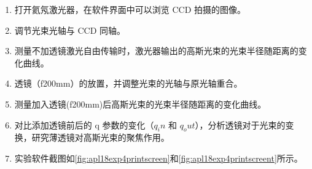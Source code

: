\begin{enumerate}
\begin{enumerate}
		\item 打开氦氖激光器，在软件界面中可以浏览 CCD 拍摄的图像。
		
		\item 调节光束光轴与 CCD 同轴。
		
		\item 测量不加透镜激光自由传输时，激光器输出的高斯光束的光束半径随距离的变化曲线。
		
		\item 透镜（f200mm）的放置，并调整光束的光轴与原光轴重合。
		
		\item 测量加入透镜(f200mm)后高斯光束的光束半径随距离的变化曲线。
		
		\item 对比添加透镜前后的 q 参数的变化（$q_in$ 和 $q_out$），分析透镜对于光束的变换，研究薄透镜对高斯光束的聚焦作用。
		
		\item 实验软件截图如\cref{fig:apl18exp4printscreen}和\cref{fig:apl18exp4printscreent}所示。
	\end{enumerate}
\end{enumerate}	

